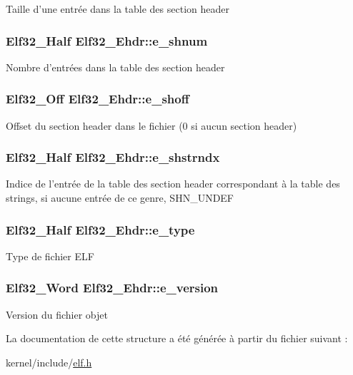 Taille d'une entrée dans la table des section header \hypertarget{structElf32__Ehdr_a11249bd7e61642742a68a3e7f69ac721}{
\subsubsection[{e\+\_\+shnum}]{\setlength{\rightskip}{0pt plus 5cm}Elf32\+\_\+\+Half Elf32\+\_\+\+Ehdr\+::e\+\_\+shnum}}\label{structElf32__Ehdr_a11249bd7e61642742a68a3e7f69ac721}
Nombre d'entrées dans la table des section header \hypertarget{structElf32__Ehdr_a00601af5187a1b3f8babfe9cddd95c15}{
\subsubsection[{e\+\_\+shoff}]{\setlength{\rightskip}{0pt plus 5cm}Elf32\+\_\+\+Off Elf32\+\_\+\+Ehdr\+::e\+\_\+shoff}}\label{structElf32__Ehdr_a00601af5187a1b3f8babfe9cddd95c15}
Offset du section header dans le fichier (0 si aucun section header) \hypertarget{structElf32__Ehdr_a3b3070ccd7d971e8cb6ea58d4c6fab09}{
\subsubsection[{e\+\_\+shstrndx}]{\setlength{\rightskip}{0pt plus 5cm}Elf32\+\_\+\+Half Elf32\+\_\+\+Ehdr\+::e\+\_\+shstrndx}}\label{structElf32__Ehdr_a3b3070ccd7d971e8cb6ea58d4c6fab09}
Indice de l'entrée de la table des section header correspondant à la table des strings, si aucune entrée de ce genre, S\+H\+N\+\_\+\+U\+N\+D\+E\+F \hypertarget{structElf32__Ehdr_a49e40a791813c06e3b6ebcb53aef1bb8}{
\subsubsection[{e\+\_\+type}]{\setlength{\rightskip}{0pt plus 5cm}Elf32\+\_\+\+Half Elf32\+\_\+\+Ehdr\+::e\+\_\+type}}\label{structElf32__Ehdr_a49e40a791813c06e3b6ebcb53aef1bb8}
Type de fichier E\+L\+F \hypertarget{structElf32__Ehdr_aa27627bda53281221325df4dd782e800}{
\subsubsection[{e\+\_\+version}]{\setlength{\rightskip}{0pt plus 5cm}Elf32\+\_\+\+Word Elf32\+\_\+\+Ehdr\+::e\+\_\+version}}\label{structElf32__Ehdr_aa27627bda53281221325df4dd782e800}
Version du fichier objet 

La documentation de cette structure a été générée à partir du fichier suivant \+:\begin{DoxyCompactItemize}
\item 
kernel/include/\hyperlink{elf_8h}{elf.\+h}\end{DoxyCompactItemize}
